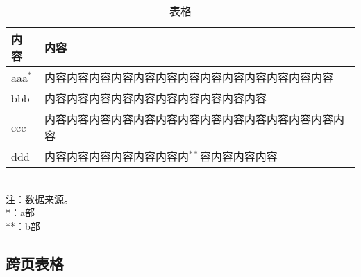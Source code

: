 \begin{table}[htb]
	\centering
	\caption{表格}
	\label{table4}
	\begin{minipage}[c]{0.8\linewidth}
		\begin{tabular*}{\linewidth}{lp{10cm}}
			\toprule[1.5pt]
			内容 & 内容 \\
			\midrule[1pt]
			aaa$^{*}$ & 内容内容内容内容内容内容内容内容内容内容内容内容内容\\
			bbb & 内容内容内容内容内容内容内容内容内容内容\\
			ccc & 内容内容内容内容内容内容内容内容内容内容内容内容内容内容\\
			ddd & 内容内容内容内容内容内容内$^{**}$容内容内容内容\\
			\bottomrule[1.5pt]
		\end{tabular*}\\[2pt]
		注：数据来源。\\
		*：a部\\
		**：b部
	\end{minipage}
\end{table}


\subsection{跨页表格}

